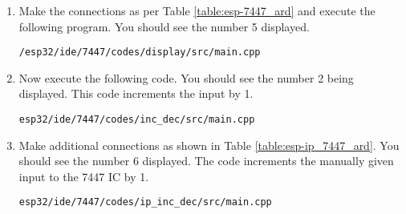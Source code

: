 \begin{enumerate}
\item Make the connections as per Table \ref{table:esp-7447_ard}  and execute the following program.  You should see the number 5 displayed.
\begin{lstlisting}
/esp32/ide/7447/codes/display/src/main.cpp
\end{lstlisting}
\begin{table}[H]
\centering

\caption{}
\label{table:esp-7447_ard}
\end{table}
\item Now execute the following code.  You should see the number 2 being displayed.  This code increments the input by 1.
\begin{lstlisting}
esp32/ide/7447/codes/inc_dec/src/main.cpp
\end{lstlisting}
\item Make additional connections as shown in Table \ref{table:esp-ip_7447_ard}. You should see the number 6 displayed. The code increments the manually given input to the 7447 IC by 1.
\begin{lstlisting}
esp32/ide/7447/codes/ip_inc_dec/src/main.cpp
\end{lstlisting}
\begin{table}[H]
\centering

\caption{}
\label{table:esp-ip_7447_ard}
\end{table}
\end{enumerate}
